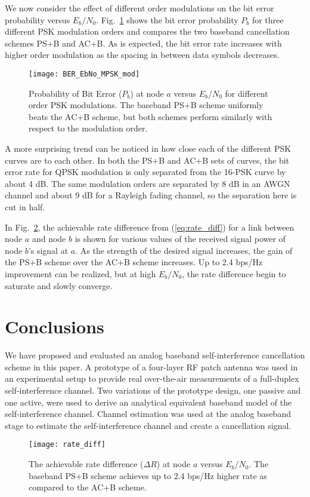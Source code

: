 \documentclass[12pt, journal,draftcls,letterpaper,onecolumn]{IEEEtran}
\begin{document}
We now consider the effect of different order modulations on the bit error probability versus $E_b/N_0$.  Fig.~\ref{fig:BER_MPSK} shows the bit error probability $P_b$ for three different PSK modulation orders and compares the two baseband cancellation schemes PS+B and AC+B.  As is expected, the bit error rate increases with higher order modulation as the spacing in between data symbols decreases.  
\begin{figure}[htp] 
\begin{center} 
  \texttt{[image: BER\_EbNo\_MPSK\_mod]}
\caption[fig:BER_MPSK]{Probability of Bit Error ($P_b$) at node $a$ versus $E_b/N_0$ for different order PSK modulations.  The baseband PS+B scheme uniformly beats the AC+B scheme, but both schemes perform similarly with respect to the modulation order.  }  
  \label{fig:BER_MPSK} 
\end{center} 
\end{figure} 
A more surprising trend can be noticed in how close each of the different PSK curves are to each other.  In both the PS+B and AC+B sets of curves, the bit error rate for QPSK modulation is only separated from the 16-PSK curve by about 4 dB.  The same modulation orders are separated by 8 dB in an AWGN channel and about 9 dB for a Rayleigh fading channel, so the separation here is cut in half.  

In Fig.~\ref{fig:rate}, the achievable rate difference from (\ref{eq:rate_diff}) for a link between node $a$ and node $b$ is shown for various values of the received signal power of node $b$'s signal at $a$.  As the strength of the desired signal increases, the gain of the PS+B scheme over the AC+B scheme increases.  Up to 2.4 bps/Hz improvement can be realized, but at high $E_b/N_0$, the rate difference begin to saturate and slowly converge. 


\section{Conclusions}
\label{sec:conclusion}
We have proposed and evaluated an analog baseband self-interference cancellation scheme in this paper.  A prototype of a four-layer RF patch antenna was used in an experimental setup to provide real over-the-air measurements of a full-duplex self-interference channel.  Two variations of the prototype design, one passive and one active, were used to derive an analytical equivalent baseband model of the self-interference channel.  Channel estimation was used at the analog baseband stage to estimate the self-interference channel and create a cancellation signal.  
\begin{figure}[htp]
\begin{center} 
  \texttt{[image: rate\_diff]}
\caption[fig:rate]{The achievable rate difference ($\Delta R$) at node $a$ versus $E_b/N_0$.  The baseband PS+B scheme achieves up to 2.4 bps/Hz higher rate as compared to the AC+B scheme.} 
  \label{fig:rate} 
\end{center}  
\end{figure} 
\end{document}
